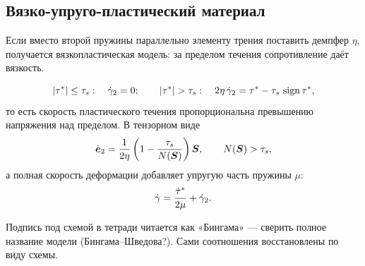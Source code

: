 \subsection{Вязко-упруго-пластический материал}

Если вместо второй пружины параллельно элементу трения поставить демпфер
$\eta$, получается вязкопластическая модель: за пределом течения сопротивление
даёт вязкость.


\[
  \left\lvert \tau^* \right\rvert \le \tau_s: \quad \dot{\gamma}_2 = 0 ;
  \qquad
  \left\lvert \tau^* \right\rvert > \tau_s: \quad
  2\eta\,\dot{\gamma}_2 = \tau^* - \tau_s\,\operatorname{sign}\tau^* ,
\]
то есть скорость пластического течения пропорциональна превышению напряжения
над пределом. В тензорном виде
\[
  \dot{\boldsymbol{e}}_2
  = \frac{1}{2\eta}\left(1 - \frac{\tau_s}{N(\boldsymbol{S})}\right)\boldsymbol{S} ,
  \qquad N(\boldsymbol{S}) > \tau_s ,
\]
а полная скорость деформации добавляет упругую часть пружины $\mu$:
\[
  \dot{\gamma} = \frac{\dot{\tau}^*}{2\mu} + \dot{\gamma}_2 .
\]

\begin{warn}
Подпись под схемой в тетради читается как «Бингама» — сверить полное название
модели (Бингама–Шведова?). Сами соотношения восстановлены по виду схемы.
\end{warn}

